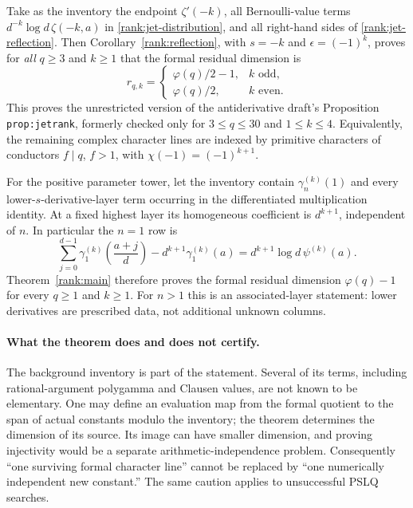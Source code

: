 \documentclass[11pt,a4paper]{article}
\theoremstyle{definition}
\theoremstyle{remark}
\numberwithin{equation}{section}
\begin{document}
Take as the inventory the endpoint $\zeta'(-k)$, all Bernoulli-value
terms $d^{-k}\log d\,\zeta(-k,a)$ in
\eqref{rank:jet-distribution}, and all right-hand sides of
\eqref{rank:jet-reflection}.  Then
Corollary~\ref{rank:reflection}, with $s=-k$ and $\epsilon=(-1)^k$,
proves for \emph{all} $q\geq3$ and $k\geq1$ that the formal residual
dimension is
\begin{equation}\label{rank:negative-result}
 r_{q,k}=\begin{cases}
  \varphi(q)/2-1,&k\text{ odd},\\
  \varphi(q)/2,&k\text{ even}.
 \end{cases}
\end{equation}
This proves the unrestricted version of the antiderivative draft's
Proposition \texttt{prop:jetrank}, formerly checked only for
$3\leq q\leq30$ and $1\leq k\leq4$.  Equivalently, the remaining
complex character lines are indexed by primitive characters of
conductors $f\mid q$, $f>1$, with $\chi(-1)=(-1)^{k+1}$.

For the positive parameter tower, let the inventory contain
$\gamma_n^{(k)}(1)$ and every lower-$s$-derivative-layer term occurring
in the differentiated multiplication identity.  At a fixed highest
layer its homogeneous coefficient is $d^{k+1}$, independent of $n$.
In particular the $n=1$ row is
\[
 \sum_{j=0}^{d-1}\gamma_1^{(k)}\left(\frac{a+j}{d}\right)
 -d^{k+1}\gamma_1^{(k)}(a)
 =d^{k+1}\log d\,\psi^{(k)}(a).
\]
Theorem~\ref{rank:main} therefore proves the formal residual dimension
$\varphi(q)-1$ for every $q\geq1$ and $k\geq1$.  For $n>1$ this is
an associated-layer statement: lower derivatives are prescribed data,
not additional unknown columns.

\paragraph{What the theorem does and does not certify.}
The background inventory is part of the statement.  Several of its
terms, including rational-argument polygamma and Clausen values, are
not known to be elementary.  One may define an evaluation map from the
formal quotient to the span of actual constants modulo the inventory;
the theorem determines the dimension of its source.  Its image can
have smaller dimension, and proving injectivity would be a separate
arithmetic-independence problem.  Consequently ``one surviving formal
character line'' cannot be replaced by ``one numerically independent
new constant.''  The same caution applies to unsuccessful PSLQ searches.
\end{document}
